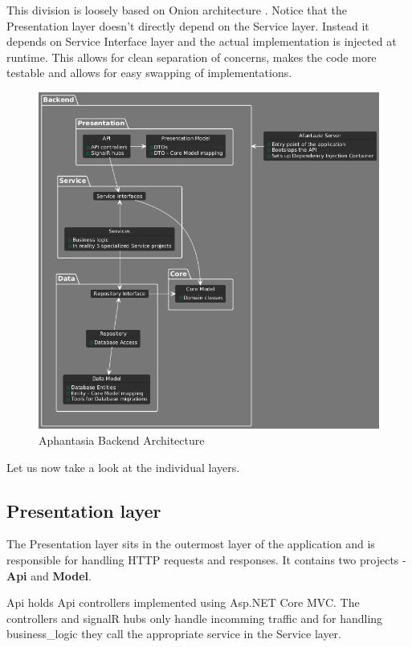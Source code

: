 This division is loosely based on Onion architecture \cite{onion_architecture}. Notice that the Presentation layer doesn't directly depend on the Service layer.
Instead it depends on Service Interface layer and the actual implementation is injected at runtime.
This allows for clean separation of concerns, makes the code more testable and allows for easy swapping of implementations.

\begin{figure}[p]\centering
    \includegraphics[width=140mm]{img/backend_architecture.png}
    \caption{Aphantasia Backend Architecture}
    \label{obr:afantazie_backend_architecture}
\end{figure}

Let us now take a look at the individual layers.

\subsection*{Presentation layer}
The Presentation layer sits in the outermost layer of the application and is responsible for handling HTTP requests and responses.
It contains two projects - \textbf{Api} and \textbf{Model}.

Api holds Api controllers implemented using Asp.NET Core MVC.
The controllers and signalR hubs only handle incomming traffic and  
for handling \gls{business_logic} they call the appropriate service in the Service layer.

